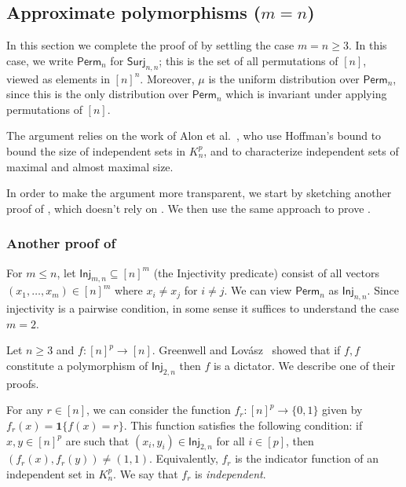 \documentclass{article}
\providecommand{\Surj}{\mathsf{Surj}}
\providecommand{\Inj}{\mathsf{Inj}}
\providecommand{\Perm}{\mathsf{Perm}}
\providecommand{\ind}[1]{\mathbf1\{#1\}}
\theoremstyle{definition}
\theoremstyle{remark}
\begin{document}
\subsection{Approximate polymorphisms (\texorpdfstring{$m = n$}{m = n})}
\label{sec:classification-approximate-perm}

In this section we complete the proof of  by settling the case $m = n \ge 3$. In this case, we write $\Perm_n$ for $\Surj_{n,n}$; this is the set of all permutations of $[n]$, viewed as elements in $[n]^n$. Moreover, $\mu$ is the uniform distribution over $\Perm_n$, since this is the only distribution over $\Perm_n$ which is invariant under applying permutations of $[n]$.

The argument relies on the work of Alon et al.~\cite{ADFS}, who use Hoffman's bound to bound the size of independent sets in $K_n^p$, and to characterize independent sets of maximal and almost maximal size.

In order to make the argument more transparent, we start by sketching another proof of , which doesn't rely on . We then use the same approach to prove .

\subsubsection{Another proof of \texorpdfstring{}{Theorem \ref{thm:surj-polymorphisms}}}
\label{sec:Perm-poly}

For $m \le n$, let $\Inj_{m,n} \subseteq [n]^m$ (the Injectivity predicate) consist of all vectors $(x_1,\dots,x_m) \in [n]^m$ where $x_i \neq x_j$ for $i \neq j$. We can view $\Perm_n$ as $\Inj_{n,n}$. Since injectivity is a pairwise condition, in some sense it suffices to understand the case $m = 2$.

Let $n \ge 3$ and $f\colon [n]^p \to [n]$. Greenwell and Lov\'asz~\cite{GreenwellLovasz} showed that if $f,f$ constitute a polymorphism of $\Inj_{2,n}$ then $f$ is a dictator. We describe one of their proofs.

For any $r \in [n]$, we can consider the function $f_r\colon [n]^p \to \{0,1\}$ given by $f_r(x) = \ind{f(x) = r}$. This function satisfies the following condition: if $x,y \in [n]^p$ are such that $(x_i,y_i) \in \Inj_{2,n}$ for all $i \in [p]$, then $(f_r(x),f_r(y)) \neq (1,1)$. Equivalently, $f_r$ is the indicator function of an independent set in $K_n^p$. We say that $f_r$ is \emph{independent}.
\end{document}

